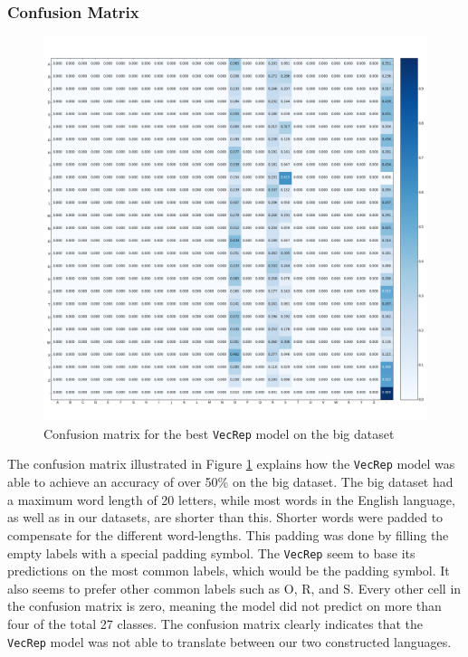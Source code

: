 \subsubsection{Confusion Matrix}
\begin{figure}[h]
    \centering
    \includegraphics[width=1\textwidth]{fig/results/experiment1/big/vecrep/confusion_matrix.png}
    \caption{Confusion matrix for the best {\tt VecRep} model on the big dataset}
    \label{fig:result1_big_vecrep_confusion_matrix}
\end{figure}

The confusion matrix illustrated in Figure \ref{fig:result1_big_vecrep_confusion_matrix} explains how the {\tt VecRep} model was able to achieve an accuracy of over 50\% on the big dataset. The big dataset had a maximum word length of 20 letters, while most words in the English language, as well as in our datasets, are shorter than this. Shorter words were padded to compensate for the different word-lengths. This padding was done by filling the empty labels with a special padding symbol. The {\tt VecRep} seem to base its predictions on the most common labels, which would be the padding symbol. It also seems to prefer other common labels such as O, R, and S. Every other cell in the confusion matrix is zero, meaning the model did not predict on more than four of the total 27 classes. The confusion matrix clearly indicates that the {\tt VecRep} model was not able to translate between our two constructed languages. 

